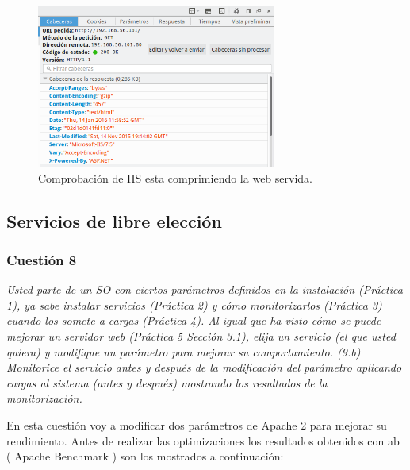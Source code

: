 \begin{figure}[H]
  \begin{center}
    \includegraphics[width=0.7\textwidth]{imagenes/11}
    \caption{Comprobación de IIS esta comprimiendo la web servida.}
    \label{fig11}
  \end{center}
\end{figure}


\subsection{Servicios de libre elección}
\subsubsection{Cuestión 8}
\textit{Usted parte de un SO con ciertos parámetros definidos en la instalación (Práctica 1), ya sabe instalar servicios (Práctica 2) y cómo monitorizarlos (Práctica 3) cuando los somete a cargas (Práctica 4). Al igual que ha visto cómo se puede mejorar un servidor web (Práctica 5 Sección 3.1), elija un servicio (el que usted quiera) y modifique un parámetro para mejorar su comportamiento. (9.b) Monitorice el servicio antes y después de la modificación del parámetro aplicando cargas al sistema (antes y después) mostrando los resultados de la monitorización.}
\newline

En esta cuestión voy a modificar dos parámetros de Apache 2 para mejorar su rendimiento. Antes de realizar las optimizaciones los resultados obtenidos con ab ( Apache Benchmark ) son los mostrados a continuación:


